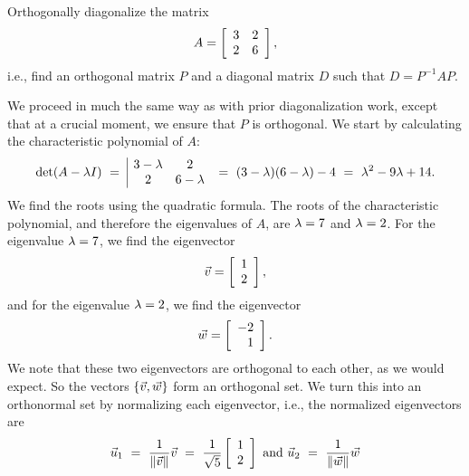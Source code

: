 \documentclass{ximera}
\begin{document}
\begin{example}\label{ex:diagonalization-symmetric}

  Orthogonally diagonalize the matrix
  \begin{equation*}
    A = \startmat{rr}
      3 & 2 \\
      2 & 6 \\
    \stopmat,
  \end{equation*}
  i.e., find an orthogonal matrix $P$ and a diagonal matrix $D$ such
  that $D = P^{-1}AP$.
\end{example}

\begin{solution}
  We proceed in much the same way as with prior diagonalization work,
  except that at a crucial moment, we ensure that $P$ is orthogonal.
  We start by calculating the characteristic polynomial of $A$:
  \begin{equation*}
    \det(A-\eigenvar I)
    ~=~ \begin{array}{|ccc|}
      3-\eigenvar & 2 \\
      2 & 6-\eigenvar
    \end{array}
    ~=~ (3-\eigenvar)(6-\eigenvar) - 4
    ~=~ \eigenvar^2 - 9\eigenvar + 14.
  \end{equation*}
  We find the roots using the quadratic formula. The roots of the
  characteristic polynomial, and therefore the eigenvalues of $A$, are
  $\eigenvar=7$ and $\eigenvar=2$. For the eigenvalue $\eigenvar=7$,
  we find the eigenvector
  \begin{equation*}
    \vect{v} = \startmat{r} 1 \\ 2 \stopmat,
  \end{equation*}
  and for the eigenvalue $\eigenvar=2$, we find the eigenvector
  \begin{equation*}
    \vect{w} = \startmat{r} -2 \\ 1 \stopmat.
  \end{equation*}
  We note that these two eigenvectors are orthogonal to each other,
  as we would expect. So
  the vectors $\set{\vect{v},\vect{w}}$ form an orthogonal set. We
  turn this into an orthonormal set by normalizing each eigenvector,
  i.e., the normalized eigenvectors are
  \begin{equation*}
    \vect{u}_1
    ~=~ \frac{1}{\norm{\vect{v}}}\vect{v}
    ~=~ \frac{1}{\sqrt{5}} \startmat{r} 1 \\ 2 \stopmat
    \quad\mbox{and}\quad
    \vect{u}_2
    ~=~ \frac{1}{\norm{\vect{w}}}\vect{w}

\end{equation*}
\end{solution}
\end{document}
